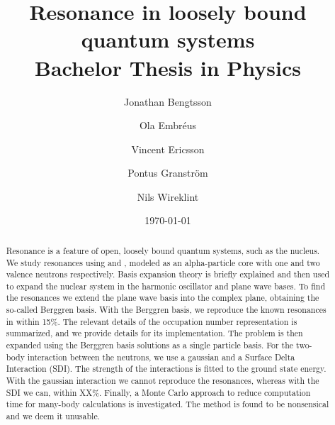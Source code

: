 \documentclass[12pt,a4paper]{report}
\begin{document}
  

\listoftodos


\title{Resonance in loosely bound quantum systems\\ 
\Large Bachelor Thesis in Physics}
\author{Jonathan Bengtsson \and Ola Embréus \and Vincent Ericsson \and Pontus Granström \and Nils Wireklint}
\date{\today}
\maketitle


\begin{abstract}
Resonance is a feature of open, loosely bound quantum systems, such as the nucleus.
We study resonances using  and , modeled as an alpha-particle core with one and two valence neutrons respectively.
Basis expansion theory is briefly explained and then used to expand the nuclear system in the harmonic oscillator and plane wave bases.
To find the resonances we extend the plane wave basis into the complex plane, obtaining the so-called Berggren basis. 
With the Berggren basis, we reproduce the known resonances in  within 15\%.
The relevant details of the occupation number representation is summarized, and we provide details for its implementation.
The  problem is then expanded using the  Berggren basis solutions as a single particle basis. 
For the two-body interaction between the neutrons, we use a gaussian and a Surface Delta Interaction (SDI).
The strength of the interactions is fitted to the  ground state energy.
With the gaussian interaction we cannot reproduce the  resonances, whereas with the SDI we can, within XX\%.
Finally, a Monte Carlo approach to reduce computation time for many-body calculations is investigated.
The method is found to be nonsensical and we deem it unusable.

\end{abstract}

\tableofcontents










\end{document}
